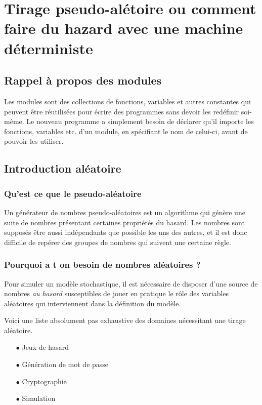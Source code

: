 \section{Tirage pseudo-alétoire ou comment faire du hazard avec une machine déterministe}


\subsection{Rappel à propos des modules}


Les modules sont des collections de fonctions, variables et autres constantes qui
peuvent être réutilisées pour écrire des programmes sans devoir les redéfinir soi-
même. Le nouveau programme a simplement besoin de déclarer qu’il importe
les fonctions, variables etc. d’un module, en spécifiant le nom de celui-ci, avant
de pouvoir les utiliser.

\subsection{Introduction aléatoire}

\subsubsection{Qu'est ce que le pseudo-aléatoire}


Un générateur de nombres pseudo-aléatoires est un algorithme qui génère une suite de nombres
présentant certaines propriétés du hasard.
Les nombres sont supposés être aussi indépendants que possible les uns des autres, et il est donc
difficile de repérer des groupes de nombres qui suivent une certaine règle.


\subsubsection{Pourquoi a t on besoin de nombres aléatoires ?}

Pour simuler un modèle stochastique, il est nécessaire de disposer d’une source
de nombres \textit{au hasard} susceptibles de jouer en pratique le rôle
des variables aléatoires qui interviennent dans la définition du modèle.

Voici une liste absolument pas exhaustive des domaines nécessitant une tirage aléatoire.

\begin{itemize}
\item[$\bullet$] Jeux de hasard
\item[$\bullet$] Génération de mot de passe
\item[$\bullet$] Cryptographie
\item[$\bullet$] Simulation
\end{itemize}


